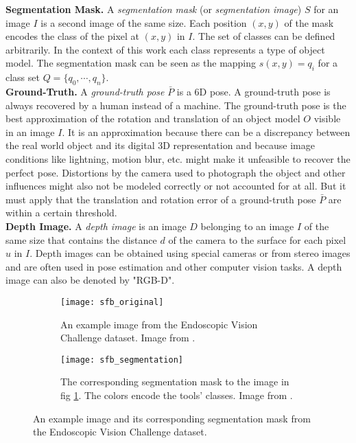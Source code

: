 \noindent\textbf{Segmentation Mask.} A \textit{segmentation mask} (or \textit{segmentation image}) $S$ for an image $I$ is a second image of the same size. Each position $(x, y)$ of the mask encodes the class of the pixel at $(x, y)$ in $I$. The set of classes can be defined arbitrarily. In the context of this work each class represents a type of object model. The segmentation mask can be seen as the mapping $s(x, y) = q_i$ for a class set $Q = \{q_0, \cdots, q_n\}$. \\

\noindent\textbf{Ground-Truth.} A \textit{ground-truth pose} $\bar{P}$ is a 6D pose. A ground-truth pose is always recovered by a human instead of a machine. The ground-truth pose is the best approximation of the rotation and translation of an object model $O$ visible in an image $I$. It is an approximation because there can be a discrepancy between the real world object and its digital 3D representation and because image conditions like lightning, motion blur, etc. might make it unfeasible to recover the perfect pose. Distortions by the camera used to photograph the object and other influences might also not be modeled correctly or not accounted for at all. But it must apply that the translation and rotation error of a ground-truth pose $\bar{P}$ are within a certain threshold. \\

\noindent\textbf{Depth Image.} A \textit{depth image} is an image $D$ belonging to an image $I$ of the same size that contains the distance $d$ of the camera to the surface for each pixel $u$ in $I$. Depth images can be obtained using special cameras or from stereo images and are often used in pose estimation and other computer vision tasks. A depth image can also be denoted by "RGB-D".

\begin{figure}[!tbp]
	\centering
	\begin{subfigure}[t]{0.47\textwidth}
	\centering
    	\texttt{[image: sfb\_original]}
    	\caption{An example image from the Endoscopic Vision Challenge dataset. Image from \cite{endovis}.}
    	\label{fig:sfb_original}
	\end{subfigure}
	\hfill
	\begin{subfigure}[t]{0.47\textwidth}
	\centering
    	\texttt{[image: sfb\_segmentation]}
    	\caption{The corresponding segmentation mask to the image in fig \ref{fig:sfb_original}. The colors encode the tools' classes. Image from \cite{endovis}.}
    	\label{fig:sfb_segmentation}
	\end{subfigure}
	\caption{An example image and its corresponding segmentation mask from the Endoscopic Vision Challenge dataset.}
	\label{fig:sfb}
\end{figure} 


